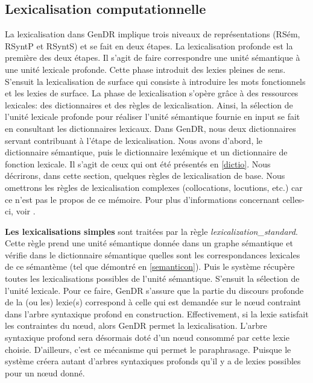\subsection{Lexicalisation computationnelle} 


La lexicalisation dans GenDR implique trois niveaux de représentations (RSém, RSyntP et RSyntS) et se fait en deux étapes. La lexicalisation profonde est la première des deux étapes. Il s'agit de faire correspondre une unité sémantique à une unité lexicale profonde. Cette phase introduit des lexies pleines de sens. S'ensuit la lexicalisation de surface qui consiste à introduire les mots fonctionnels et les lexies de surface. La phase de lexicalisation s'opère grâce à des ressources lexicales: des dictionnaires et des règles de lexicalisation. Ainsi, la sélection de l'unité lexicale profonde pour réaliser l'unité sémantique fournie en input se fait en consultant les dictionnaires lexicaux. Dans GenDR, nous deux dictionnaires servant contribuant à l'étape de lexicalisation. Nous avons d'abord, le dictionnaire sémantique, puis le dictionnaire lexémique et un dictionnaire de fonction lexicale. Il s'agit de ceux qui ont été présentés en \ref{dictio}.  Nous décrirons, dans cette section, quelques règles de lexicalisation de base. Nous omettrons les règles de lexicalisation complexes (collocations, locutions, etc.) car ce n'est pas le propos de ce mémoire. Pour plus d'informations concernant celles-ci, voir \cite{lambrey15,LambreyImplementationcollocationspour2017,dubinskaite17,lareau18}.

\textbf{Les lexicalisations simples}
sont traitées par la règle \emph{lexicalization\_standard}. Cette règle prend une unité sémantique donnée dans un graphe sémantique et vérifie dans le dictionnaire sémantique quelles sont les correspondances lexicales de ce sémantème (tel que démontré en \ref{semanticon}). Puis le système récupère toutes les lexicalisations possibles de l'unité sémantique. S'ensuit la sélection de l'unité lexicale. Pour ce faire, GenDR s'assure que la partie du discours profonde de la (ou les) lexie(s) correspond à celle qui est demandée sur le n\oe{}ud contraint dans l'arbre syntaxique profond en construction. Effectivement, si la lexie satisfait les contraintes du n\oe{}ud, alors GenDR permet la lexicalisation. L'arbre syntaxique profond sera désormais doté d'un n\oe{}ud consommé par cette lexie choisie. D'ailleurs, c'est ce mécanisme qui permet le paraphrasage. Puisque le système créera autant d'arbres syntaxiques profonds qu'il y a de lexies possibles pour un n\oe{}ud donné. 

